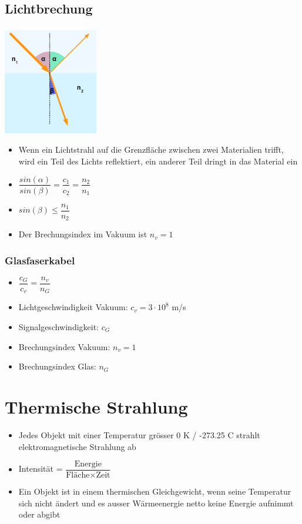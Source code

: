 \documentclass[8pt,a4paper]{scrartcl}
\begin{document}
\begin{multicols*}{3}
				\subsection{Lichtbrechung}
					\begin{multicols*}{2}
						\includegraphics[height=4.75cm]{img/brechung.png} 
						
						\begin{itemize}\itemsep0pt
							\item Wenn ein Lichtstrahl auf die Grenzfläche zwischen zwei Materialien trifft, wird ein Teil des Lichts reflektiert, ein anderer Teil dringt in das Material ein
							\item $\dfrac{sin(\alpha)}{sin(\beta)}=\dfrac{c_{1}}{c_{2}}=\dfrac{n_{2}}{n_{1}}$
							\item $sin(\beta)\leq \dfrac{n_{1}}{n_{2}}$
							\item Der Brechungsindex im Vakuum ist $n_{v} = 1$
						\end{itemize}	
					\end{multicols*}
					
					\subsubsection{Glasfaserkabel}
						\begin{itemize}\itemsep0pt
							\item $\dfrac{c_{G}}{c_{v}}=\dfrac{n_{v}}{n_{G}}$
							\item Lichtgeschwindigkeit Vakuum: $c_{v} = 3\cdot 10^{8}$ m/s 
							\item Signalgeschwindigkeit: $c_{G}$
							\item Brechungsindex Vakuum: $n_{v} = 1$ 
							\item Brechungsindex Glas: $n_{G}$ 
						\end{itemize}	
						
				\section{Thermische Strahlung}
					\begin{itemize}\itemsep0pt
						\item Jedes Objekt mit einer Temperatur grösser 0 K / -273.25 C strahlt elektromagnetische Strahlung ab
						\item Intensität = $\dfrac{\text{Energie}}{\text{Fläche} \times \text{Zeit}}$
						\item Ein Objekt ist in einem thermischen Gleichgewicht, wenn seine Temperatur sich nicht ändert und es ausser Wärmeenergie netto keine Energie aufnimmt oder abgibt
					\end{itemize}
					

\end{multicols*}
\end{document}
